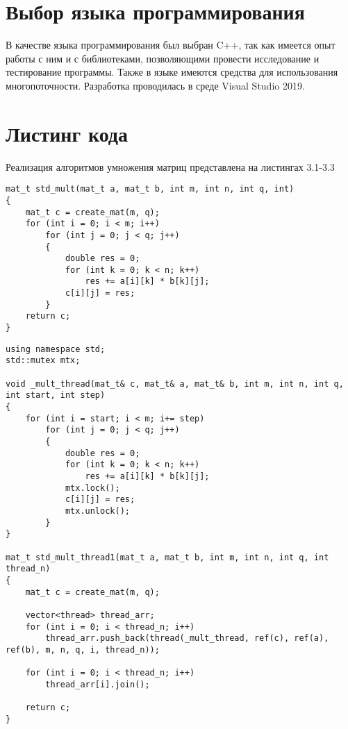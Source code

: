 \section{Выбор языка программирования}
В качестве языка программирования был выбран C++\cite{C++_Doc}, так как имеется опыт работы с ним и с библиотеками, позволяющими провести исследование и тестирование программы. Также в языке имеются средства для использования многопоточности\cite{Thread}. Разработка проводилась в среде Visual Studio 2019\cite{VisualStudio}.


\section{Листинг кода}
Реализация алгоритмов умножения матриц представлена на листингах 3.1-3.3

\begin{lstlisting}[caption = {Функция однопоточного умножения матриц}]
mat_t std_mult(mat_t a, mat_t b, int m, int n, int q, int)
{
	mat_t c = create_mat(m, q);
	for (int i = 0; i < m; i++)
		for (int j = 0; j < q; j++)
		{
			double res = 0;
			for (int k = 0; k < n; k++)
				res += a[i][k] * b[k][j];
			c[i][j] = res;
		}
	return c;
}
\end{lstlisting}

\begin{lstlisting}[caption = {Функция умножения матриц (параллельная по строкам)}]
using namespace std;
std::mutex mtx;

void _mult_thread(mat_t& c, mat_t& a, mat_t& b, int m, int n, int q, int start, int step)
{
	for (int i = start; i < m; i+= step)
		for (int j = 0; j < q; j++)
		{
			double res = 0;
			for (int k = 0; k < n; k++)
				res += a[i][k] * b[k][j];
			mtx.lock();
			c[i][j] = res;
			mtx.unlock();
		}
}

mat_t std_mult_thread1(mat_t a, mat_t b, int m, int n, int q, int thread_n)
{
	mat_t c = create_mat(m, q);
	
	vector<thread> thread_arr;
	for (int i = 0; i < thread_n; i++)
		thread_arr.push_back(thread(_mult_thread, ref(c), ref(a), ref(b), m, n, q, i, thread_n));
	
	for (int i = 0; i < thread_n; i++)
		thread_arr[i].join();
	
	return c;
}
\end{lstlisting}

